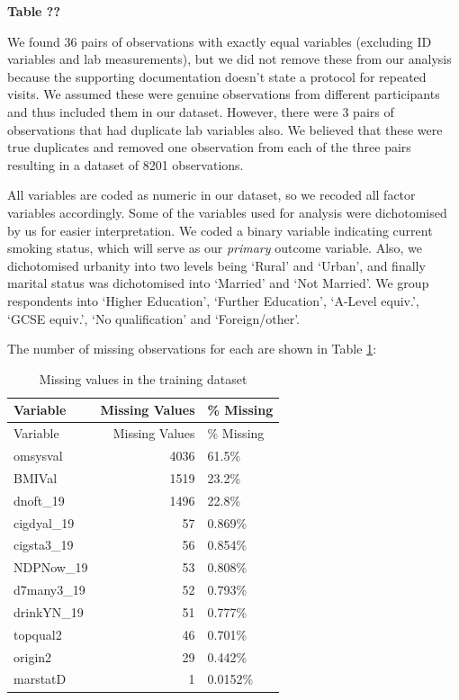\documentclass[
  11pt,
]{article}
\begin{document}
\textbf{Table ??}

We found 36 pairs of observations with exactly equal variables
(excluding ID variables and lab measurements), but we did not remove
these from our analysis because the supporting documentation doesn't
state a protocol for repeated visits. We assumed these were genuine
observations from different participants and thus included them in our
dataset. However, there were 3 pairs of observations that had duplicate
lab variables also. We believed that these were true duplicates and
removed one observation from each of the three pairs resulting in a
dataset of 8201 observations.

All variables are coded as numeric in our dataset, so we recoded all
factor variables accordingly. Some of the variables used for analysis
were dichotomised by us for easier interpretation. We coded a binary
variable indicating current smoking status, which will serve as our
\emph{primary} outcome variable. Also, we dichotomised urbanity into two
levels being `Rural' and `Urban', and finally marital status was
dichotomised into `Married' and `Not Married'. We group respondents into
`Higher Education', `Further Education', `A-Level equiv.', `GCSE
equiv.', `No qualification' and `Foreign/other'.

The number of missing observations for each are shown in Table
\ref{tab:output-na-table}:

\begin{longtable}[]{@{}lrl@{}}
\caption{Missing values in the training
dataset\label{tab:output-na-table}}\tabularnewline
\toprule\noalign{}
Variable & Missing Values & \% Missing \\
\midrule\noalign{}
\endfirsthead
\toprule\noalign{}
Variable & Missing Values & \% Missing \\
\midrule\noalign{}
\endhead
\bottomrule\noalign{}
\endlastfoot
omsysval & 4036 & 61.5\% \\
BMIVal & 1519 & 23.2\% \\
dnoft\_19 & 1496 & 22.8\% \\
cigdyal\_19 & 57 & 0.869\% \\
cigsta3\_19 & 56 & 0.854\% \\
NDPNow\_19 & 53 & 0.808\% \\
d7many3\_19 & 52 & 0.793\% \\
drinkYN\_19 & 51 & 0.777\% \\
topqual2 & 46 & 0.701\% \\
origin2 & 29 & 0.442\% \\
marstatD & 1 & 0.0152\% \\
\end{longtable}
\end{document}

